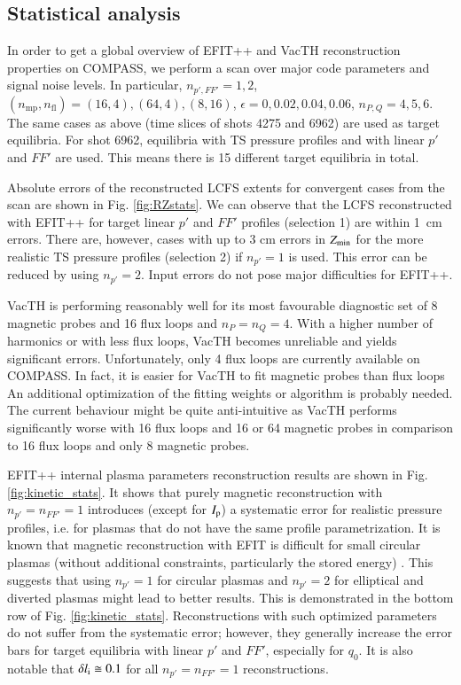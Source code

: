 \subsection{Statistical analysis} %
\label{sub:statistical_analysis}

In order to get a global overview of EFIT++ and VacTH reconstruction properties on COMPASS, we perform a scan over major code parameters and signal noise levels. In particular, $n_{p',FF'} = 1,2 $, $(n_\mathrm{mp}, n_\mathrm{fl}) = (16, 4), (64, 4), (8, 16)$, $\epsilon = 0, 0.02, 0.04, 0.06$, $n_{P,Q} = 4, 5, 6$. The same cases as above (time slices of shots 4275 and 6962) are used as target equilibria. For shot 6962, equilibria with TS pressure profiles and with linear $p'$ and $FF'$ are used. This means there is 15 different target equilibria in total.

Absolute errors of the reconstructed LCFS extents for convergent cases from the scan are shown in Fig. \ref{fig:RZstats}. We can observe that the LCFS reconstructed with EFIT++ for target linear $p'$ and $FF'$ profiles (selection 1) are within 1~cm errors. There are, however, cases with up to 3 cm errors in $Z_{\rm{min}}$ for the more realistic TS pressure profiles (selection 2) if $n_{p'}=1$ is used. This error can be reduced by using $n_{p'}=2$. Input errors do not pose major difficulties for EFIT++. 

VacTH is performing reasonably well for its most favourable diagnostic set of 8 magnetic probes and 16 flux loops and $n_P = n_Q = 4$. With a higher number of harmonics or with less flux loops, VacTH becomes unreliable and yields significant errors. Unfortunately, only 4 flux loops are currently available on COMPASS. In fact, it is easier for VacTH to fit magnetic probes than flux loops
An additional optimization of the fitting weights or algorithm is probably needed. The current behaviour might be quite anti-intuitive as VacTH performs significantly worse with 16 flux loops and 16 or 64 magnetic probes in comparison to 16 flux loops and only 8 magnetic probes. 

EFIT++ internal plasma parameters reconstruction results are shown in Fig. \ref{fig:kinetic_stats}. It shows that purely magnetic reconstruction with $n_{p'}=n_{FF'}=1$ introduces (except for $I_{\rm{p}}$) a systematic error for realistic pressure profiles, i.e. for plasmas that do not have the same profile parametrization. 
It is known that magnetic reconstruction with EFIT is difficult for small circular plasmas (without additional constraints, particularly the stored energy) \cite{efit1985}.
This suggests that using $n_{p'}=1$ for circular plasmas and $n_{p'}=2$ for elliptical and diverted plasmas might lead to better results. This is demonstrated in the bottom row of Fig. \ref{fig:kinetic_stats}.
Reconstructions with such optimized parameters do not suffer from the systematic error; however, they generally increase the error bars for target equilibria with linear $p'$ and $FF'$, especially for $q_0$. It is also notable that $\delta l_{\rm{i}} \cong 0.1$ for all $n_{p'}=n_{FF'}=1$ reconstructions.

